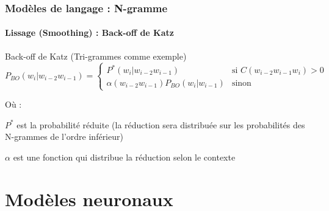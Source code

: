 \documentclass[xcolor=table]{beamer}
\begin{document}
\begin{frame}
\frametitle{Modèles de langage : N-gramme}
\framesubtitle{Lissage (Smoothing) : Back-off de Katz}

\begin{block}{Back-off de Katz (Tri-grammes comme exemple)}
	\[%
	P_{BO}(w_i | w_{i-2} w_{i-1}) = 
	\begin{cases}
	P^*(w_i | w_{i-2} w_{i-1}) & \text{si } C(w_{i-2} w_{i-1} w_i) > 0 \\
	\alpha(w_{i-2} w_{i-1}) P_{BO}(w_i | w_{i-1}) & \text{sinon}
	\end{cases}
	\]
	
	Où : 
	
	$P^*$ est la probabilité réduite (la réduction sera distribuée sur les probabilités des N-grammes de l'ordre inférieur)
	
	$\alpha$ est une fonction qui distribue la réduction selon le contexte
\end{block}
%
%
\end{frame}


\section{Modèles neuronaux}

%
%
\end{document}
